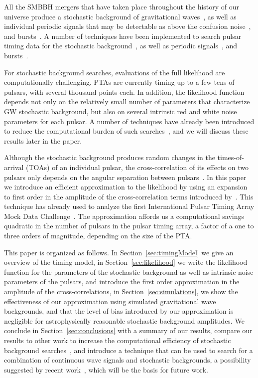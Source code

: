 \documentclass[iop]{emulateapj} \usepackage{apjfonts}
\begin{document}
All the SMBBH mergers that have taken place throughout the history of
our universe produce a stochastic background of gravitational
waves~\citep{lb01,jb03,wl03,vhm03,ein+04,svc08,s13,McWilliams:2012jj},
as well as individual periodic signals that may be detectable as above
the confusion noise~\citep{svv09,sv10,rs11,rwh+12,Mingarelli:2012hh},
and bursts~\citep{vl10,Cordes:2012zz}. A number of techniques have
been implemented to search pulsar timing data for the stochastic
background~\citep{det79,srt+90,l02,jhl+05,jhs+06,abc+09,hlm+09,vlm+09,ych+11,vhj+11,Cordes:2011vg,dfg+12},
as well as periodic signals~\citep{jll+04,yhj+10,cc10,lwk+11,
ejm12,bs12,esc12,pbs+12}, and bursts~\citep{fl10}.

For stochastic background searches, evaluations of the full likelihood
are computationally challenging. PTAs are currently timing up to a few
tens of pulsars, with several thousand points each. In addition, the
likelihood function depends not only on the relatively small number of
parameters that characterize GW stochastic background, but also on
several intrinsic red and white noise parameters for each pulsar. A
number of techniques have already been introduced to reduce the
computational burden of such
searches~\citep{vh12,Lentati:2012xb,Taylor:2012vx}, and we will
discuss these results later in the paper.

Although the stochastic background produces random changes in the
times-of-arrival (TOAs) of an individual pulsar, the cross-correlation
of its effects on two pulsars only depends on the angular separation
between pulsars~\citep{hd83}. In this paper we introduce an efficient
approximation to the likelihood by using an expansion to first order
in the amplitude of the cross-correlation terms introduced
by~\cite{abc+09}. This technique has already used to analyze the first
International Pulsar Timing Array Mock Data Challenge~\citep{esc12b}.
The approximation affords us a computational savings quadratic in the
number of pulsars in the pulsar timing array, a factor of a one to
three orders of magnitude, depending on the size of the PTA.

This paper is organized as follows. In Section~\ref{sec:timingModel}
we give an overview of the timing model, in
Section~\ref{sec:likelihood} we write the likelihood function for the
parameters of the stochastic background as well as intrinsic noise
parameters of the pulsars, and introduce the first order approximation
in the amplitude of the cross-correlations, in
Section~\ref{sec:simulations}, we show the effectiveness of our
approximation using simulated gravitational wave backgrounds, and that
the level of bias introduced by our approximation is negligible for
astrophysically reasonable stochastic background amplitudes. We
conclude in Section~\ref{sec:conclusions} with a summary of our
results, compare our results to other work to increase the
computational efficiency of stochastic background
searches~\citep{vh12,Lentati:2012xb,Taylor:2012vx}, and introduce a
technique that can be used to search for a combination of continuous
wave signals and stochastic backgrounds, a possibility suggested by
recent work~\citep{rwh+12}, which will be the basis for future work.
\end{document}
